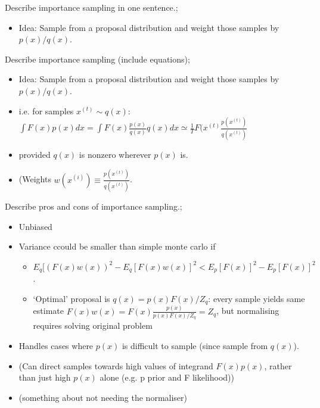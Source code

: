 \documentclass{article}
\begin{document}
Describe importance sampling in one sentence.; \begin{itemize} \item Idea: Sample from a proposal distribution and weight those samples by $p(x)/q(x)$. \end{itemize}

Describe importance sampling (include equations); \begin{itemize} \item Idea: Sample from a proposal distribution and weight those samples by $p(x)/q(x)$. \item i.e. for samples $x^{(t)}\sim q(x)$: $\int F(x)p(x)dx = \int F(x)\frac{p(x)}{q(x)}q(x) dx \simeq \frac{1}{T}F(x^{(t)}\frac{p(x^{(t)})}{q(x^{(t)})}$ \item provided $q(x)$ is nonzero wherever $p(x)$ is.  \item (Weights $w(x^{(i)}) \equiv \frac{p(x^{(t)})}{q(x^{(t)})}$. \end{itemize}

Describe pros and cons of importance sampling.; \begin{itemize} \item Unbiased \item Variance ccould be smaller than simple monte carlo if  \begin{itemize} \item $E_q[(F(x)w(x))^2 - E_q [F(x)w(x)]^2 < E_p [F(x)]^2 - E_p [F(x)]^2$. \item `Optimal' proposal is $q(x) = p(x)F(x)/Z_q$: every sample yields same estimate $F(x)w(x) = F(x)\frac{p(x)}{p(x)F(x)/Z_q}=Z_q$, but normalising requires solving original problem \end{itemize} \item Handles cases where $p(x)$ is difficult to sample (since sample from $q(x)$). \item (Can direct samples towards high values of integrand $F(x)p(x)$, rather than just high $p(x)$ alone (e.g. p prior and F likelihood)) \item (something about not needing the normaliser) \end{itemize}
\end{document}
